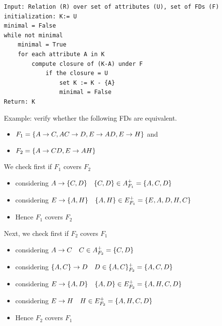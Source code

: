 \documentclass{article}
\begin{document}

\newpage
{}
\begin{verbatim}
Input: Relation (R) over set of attributes (U), set of FDs (F)
initialization: K:= U
minimal = False
while not minimal
    minimal = True
    for each attribute A in K
        compute closure of (K-A) under F
            if the closure = U
                set K := K - {A}
                minimal = False
Return: K
\end{verbatim}



Example: verify whether the following FDs are equivalent.
\begin{itemize}
    \item $F_1=\{A \to C, AC \to D, E \to AD, E \to H\}$ and
    \item $F_2 = \{A \to CD, E \to AH\}$
\end{itemize}
We check first if $F_1$ covers $F_2$
\begin{itemize}
    \item considering $A \to \{C,D\} \quad \{C,D\} \in A_{F_1}^+ = \{A,C,D\}$
    \item considering $E \to \{A,H\} \quad \{A,H\} \in E_{F_1}^+ = \{E,A,D,H,C\}$
    \item Hence $F_1$ covers $F_2$
\end{itemize}

Next, we check first if $F_2$ covers $F_1$
\begin{itemize}
    \item considering $A \to C \quad C \in A_{F_2}^+ = \{C,D\}$
    \item considering $\{A,C\} \to D \quad D \in \{A,C\}_{F_2}^+ = \{A,C,D\}$
    \item considering $E \to \{A,D\} \quad \{A,D\} \in E_{F_2}^+ = \{A,H,C,D\}$
    \item considering $E \to H \quad H \in E_{F_2}^+ = \{A,H,C,D\}$
    \item Hence $F_2$ covers $F_1$
\end{itemize}
\end{document}

